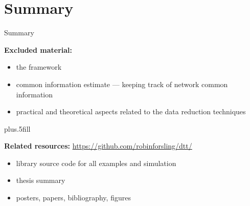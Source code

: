 \documentclass[aspectratio=1610]{beamer}
\begin{document}
\section*{Summary}


\begin{frame}{Summary}

\begin{small}

\textbf{Excluded material:}
\begin{itemize}
    \item the \abbrCLUE framework
    \item common information estimate --- keeping track of network common information
    \item practical and theoretical aspects related to the data reduction techniques
\end{itemize}

\vskip0pt plus.5fill

\textbf{Related resources:} \alert{\url{https://github.com/robinforsling/dtt/}}
\begin{itemize}
    \item \matlab library source code for all examples and simulation
    \item thesis summary
    \item posters, papers, bibliography, figures
\end{itemize}

\end{small}

\end{frame}
\end{document}
